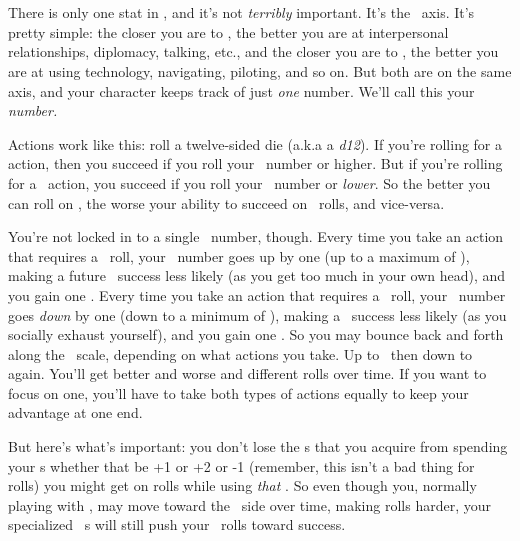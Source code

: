 \section{\feelingsvslasers}
\par
There is only one stat in \getTitleShort, and it's not \textit{terribly} important. It's the \feelingsvslasers\, axis. It's pretty simple: the closer you are to \feelings, the better you are at interpersonal relationships, diplomacy, talking, etc., and the closer you are to \lasers, the better you are at using technology, navigating, piloting, and so on. But both are on the same axis, and your character keeps track of just \textit{one} number. We'll call this your \textit{\both\, number.}

\par
Actions work like this: roll a twelve-sided die (a.k.a a \textit{d12}). If you're rolling for a \lasers\, action, then you succeed if you roll your \both\, number or higher. But if you're rolling for a \feelings\, action, you succeed if you roll your \both\, number or \textit{lower}. So the better you can roll on \lasers, the worse your ability to succeed on \feelings\, rolls, and vice-versa.

\par
You're not locked in to a single \both\, number, though. Every time you take an action that requires a \lasers\, roll, your \both\, number goes up by one (up to a maximum of \upperlimit), making a future \lasers\, success less likely (as you get too much in your own head), and you gain one \xp . Every time you take an action that requires a \feelings\, roll, your \both\, number goes \textit{down} by one (down to a minimum of \lowerlimit), making a \feelings\, success less likely (as you socially exhaust yourself), and you gain one \xp . So you may bounce back and forth along the \feelingsvslasers\, scale, depending on what actions you take. Up to \upperlimit\, then down to \lowerlimit\, again. You'll get better and worse and different rolls over time.  If you want to focus on one, you'll have to take both types of actions equally to keep your advantage at one end.

\par
But here's what's important: you don't lose the \modifier s that you acquire from spending your \xp s whether that be +1 or +2 or -1 (remember, this isn't a bad thing for \lasers\, rolls) you might get on rolls while using \textit{that} \skill . So even though you, normally playing with \lasers , may move toward the \feelings\, side over time, making rolls harder, your specialized \lasers\, \skill s will still push your \lasers\, rolls toward success.

